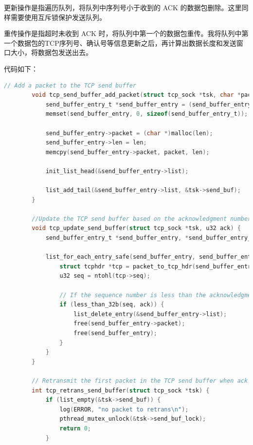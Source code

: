 \documentclass[UTF8]{report}
\begin{document}
\begin{enumerate}
    更新操作是指遍历队列，将队列中序列号小于收到的 ACK 的数据包删除。这里同样需要使用互斥锁保护发送队列。

    重传操作是指超时未收到 ACK 时，将队列中第一个的数据包重传。我将队列中第一个数据包的TCP序列号、确认号等信息更新之后，再计算出数据长度和发送窗口大小，将数据包发送出去。

    代码如下：

    \begin{lstlisting}[language=C]
        // Add a packet to the TCP send buffer
        void tcp_send_buffer_add_packet(struct tcp_sock *tsk, char *packet, int len) {
            send_buffer_entry_t *send_buffer_entry = (send_buffer_entry_t *)malloc(sizeof(send_buffer_entry_t));
            memset(send_buffer_entry, 0, sizeof(send_buffer_entry_t));
        
            send_buffer_entry->packet = (char *)malloc(len);
            send_buffer_entry->len = len;
            memcpy(send_buffer_entry->packet, packet, len);
        
            init_list_head(&send_buffer_entry->list);
        
            list_add_tail(&send_buffer_entry->list, &tsk->send_buf);
        }
        
        //Update the TCP send buffer based on the acknowledgment number
        void tcp_update_send_buffer(struct tcp_sock *tsk, u32 ack) {
            send_buffer_entry_t *send_buffer_entry, *send_buffer_entry_q;
        
            list_for_each_entry_safe(send_buffer_entry, send_buffer_entry_q, &tsk->send_buf, list) {
                struct tcphdr *tcp = packet_to_tcp_hdr(send_buffer_entry->packet);
                u32 seq = ntohl(tcp->seq);
        
                // If the sequence number is less than the acknowledgment number, delete the entry
                if (less_than_32b(seq, ack)) {
                    list_delete_entry(&send_buffer_entry->list);
                    free(send_buffer_entry->packet);
                    free(send_buffer_entry);
                }
            }
        }
        
        // Retransmit the first packet in the TCP send buffer when ack time exceed
        int tcp_retrans_send_buffer(struct tcp_sock *tsk) {
            if (list_empty(&tsk->send_buf)) {
                log(ERROR, "no packet to retrans\n");
                pthread_mutex_unlock(&tsk->send_buf_lock);
                return 0;
            }
        

\end{lstlisting}
\end{enumerate}
\end{document}
